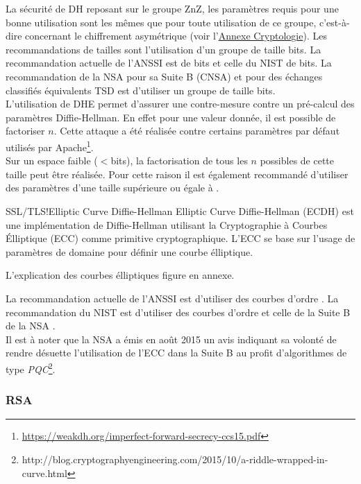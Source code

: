 \documentclass[twoside,a4paper,12pt,titlepage]{book}
\begin{document}
La sécurité de \gls{DH} reposant sur le groupe \gls{ZnZ}, les paramètres requis pour une bonne utilisation sont les mêmes que pour toute utilisation de ce groupe, c'est-à-dire concernant le chiffrement asymétrique (voir l'\hyperref[analCrypto]{Annexe Cryptologie}). Les recommandations de tailles sont l'utilisation d'un groupe de taille \DHrecosize bits. La recommandation actuelle de l'\gls{ANSSI} est de \DHrecosizeAnssi bits et celle du \gls{NIST} de \DHrecosizeNIST bits. La recommandation de la NSA pour sa Suite B (CNSA) et pour des échanges classifiés équivalents TSD est d'utiliser un groupe de taille \DHrecosizeCNSA bits.\\
L'utilisation de DHE permet d'assurer une contre-mesure contre un pré-calcul des paramètres Diffie-Hellman. En effet pour une valeur donnée, il est possible de factoriser $n$. Cette attaque a été réalisée contre certains paramètres par défaut utilisés par Apache\footnote{\url{https://weakdh.org/imperfect-forward-secrecy-ccs15.pdf}}.\\
Sur un espace faible ($<$\DHminsize bits), la factorisation de tous les $n$ possibles de cette taille peut être réalisée. Pour cette raison il est également recommandé d'utiliser des paramètres d'une taille supérieure ou égale à \DHrecosize.\\
\begin{Define}{SSL/TLS!Elliptic Curve Diffie-Hellman}
Elliptic Curve Diffie-Hellman (ECDH) est une implémentation de Diffie-Hellman utilisant la Cryptographie à Courbes Élliptique (ECC) comme primitive cryptographique. L'\gls{ECC} se base sur l'usage de paramètres de domaine pour définir une courbe élliptique.\\
\end{Define}
\begin{Warning}
L'explication des courbes élliptiques figure en annexe.
\end{Warning}

La recommandation actuelle de l'\gls{ANSSI} est d'utiliser des courbes d'ordre \ECDHrecosizeAnssi. La recommandation du \gls{NIST} est d'utiliser des courbes d'ordre \ECDHrecosizeNIST et celle de la Suite B de la \gls{NSA} \ECDHrecosizeCNSA.\\
Il est à noter que la \gls{NSA} a émis en août 2015 un avis indiquant sa volonté de rendre désuette l'utilisation de l'ECC dans la Suite B au profit d'algorithmes de type \textit{\gls{PQC}}\footnote{http://blog.cryptographyengineering.com/2015/10/a-riddle-wrapped-in-curve.html}.

\subsubsection{RSA}
\end{document}
